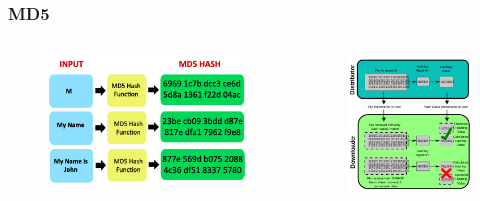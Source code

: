 \documentclass{beamer}
\begin{document}
\begin{frame}
\frametitle{MD5}
\begin{columns}[c] %

\begin{figure}
\includegraphics[width=0.8\linewidth]{md5.jpg}
\end{figure}

\begin{figure}
\includegraphics[width=0.8\linewidth]{diagram-md5.png}
\end{figure}
\end{columns}
\end{frame}
\end{document}
